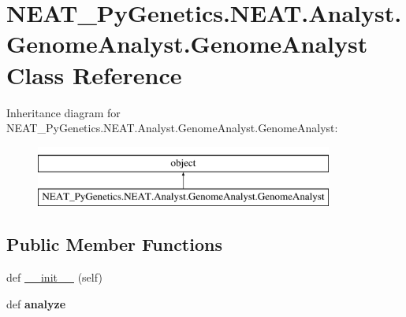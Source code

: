 \hypertarget{class_n_e_a_t___py_genetics_1_1_n_e_a_t_1_1_analyst_1_1_genome_analyst_1_1_genome_analyst}{}\section{N\+E\+A\+T\+\_\+\+Py\+Genetics.\+N\+E\+A\+T.\+Analyst.\+Genome\+Analyst.\+Genome\+Analyst Class Reference}
\label{class_n_e_a_t___py_genetics_1_1_n_e_a_t_1_1_analyst_1_1_genome_analyst_1_1_genome_analyst}
Inheritance diagram for N\+E\+A\+T\+\_\+\+Py\+Genetics.\+N\+E\+A\+T.\+Analyst.\+Genome\+Analyst.\+Genome\+Analyst\+:\begin{figure}[H]
\begin{center}
\leavevmode
\includegraphics[height=2.000000cm]{class_n_e_a_t___py_genetics_1_1_n_e_a_t_1_1_analyst_1_1_genome_analyst_1_1_genome_analyst}
\end{center}
\end{figure}
\subsection*{Public Member Functions}
\begin{DoxyCompactItemize}
\item 
def \hyperlink{class_n_e_a_t___py_genetics_1_1_n_e_a_t_1_1_analyst_1_1_genome_analyst_1_1_genome_analyst_a2b9e3334de517a0555177ee6bcc0ac04}{\+\_\+\+\_\+init\+\_\+\+\_\+} (self)
\item 
def {\bfseries analyze}\hypertarget{class_n_e_a_t___py_genetics_1_1_n_e_a_t_1_1_analyst_1_1_genome_analyst_1_1_genome_analyst_afdd3b4e6b0b8275dd62677b8d5a18933}{}\label{class_n_e_a_t___py_genetics_1_1_n_e_a_t_1_1_analyst_1_1_genome_analyst_1_1_genome_analyst_afdd3b4e6b0b8275dd62677b8d5a18933}

\end{DoxyCompactItemize}
